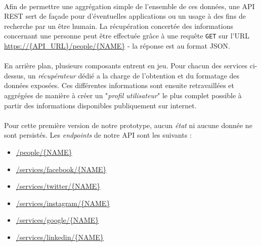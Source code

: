 \paragraph{} Afin de permettre une aggrégation simple de l'ensemble de ces données, une 
API REST sert de façade pour d'éventuelles applications ou un usage à des fins de recherche
par un être humain. La récupération concertée des informations concernant une personne peut
être effectuée grâce à une requête \lstinline{GET} sur l'URL \url{https://{API_URL}/people/{NAME}}
- la réponse est au format JSON.

\paragraph{} En arrière plan, plusieurs composants entrent en jeu. Pour chacun des services
ci-dessus, un \emph{récupérateur} dédié a la charge de l'obtention et du formatage des données
exposées. Ces différentes informations sont ensuite retravaillées et aggrégées de manière 
à créer un "\emph{profil utilisateur}" le plus complet possible à partir des informations
disponibles publiquement sur internet.

\paragraph{} Pour cette première version de notre prototype, aucun \emph{état} ni aucune
donnée ne sont persistés. Les \emph{endpoints} de notre API sont les suivants :

\begin{itemize}
    \item \url{/people/{NAME}}
    \item \url{/services/facebook/{NAME}}
    \item \url{/services/twitter/{NAME}}
    \item \url{/services/instagram/{NAME}}
    \item \url{/services/google/{NAME}}
    \item \url{/services/linkedin/{NAME}}
\end{itemize}



 

